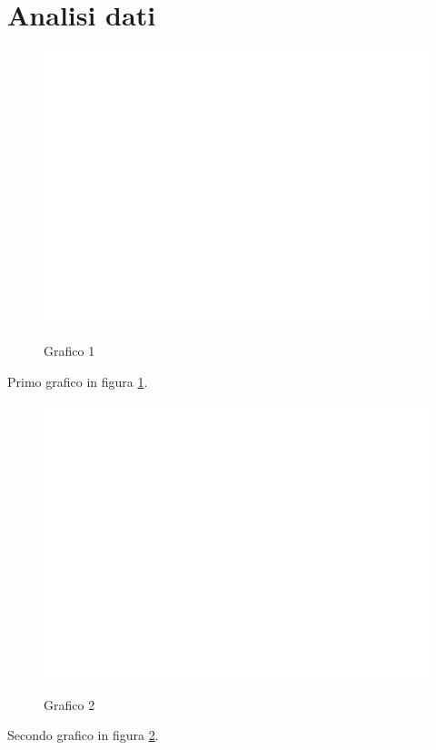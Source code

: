 \section{Analisi dati}
\label{analisiDati}

\begin{figure}[t]
	\caption{Grafico 1}
	\includegraphics[page=1,width=\textwidth]{../R/grafici.pdf}
	\label{fig1}
\end{figure}

Primo grafico in figura \ref{fig1}.

\clearpage

\begin{figure}[t]
	\caption{Grafico 2}
	\includegraphics[page=2,width=\textwidth]{../R/grafici.pdf}
	\label{fig2}
\end{figure}

Secondo grafico in figura \ref{fig2}.
